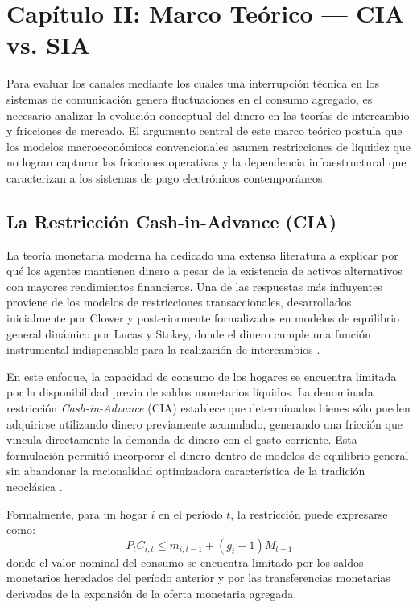 \newpage
\section{Cap\'itulo II: Marco Te\'orico --- CIA vs. SIA}\label{capitulo2}

Para evaluar los canales mediante los cuales una interrupci\'on t\'ecnica en los sistemas de comunicaci\'on genera fluctuaciones en el consumo agregado, es necesario analizar la evoluci\'on conceptual del dinero en las teor\'ias de intercambio y fricciones de mercado. El argumento central de este marco te\'orico postula que los modelos macroecon\'omicos convencionales asumen restricciones de liquidez que no logran capturar las fricciones operativas y la dependencia infraestructural que caracterizan a los sistemas de pago electr\'onicos contempor\'aneos.

\subsection{La Restricci\'on Cash-in-Advance (CIA)}
\label{sec:2_1}

La teor\'ia monetaria moderna ha dedicado una extensa literatura a explicar 
por qu\'e los agentes mantienen dinero a pesar de la existencia de activos 
alternativos con mayores rendimientos financieros. Una de las respuestas m\'as 
influyentes proviene de los modelos de restricciones transaccionales, desarrollados 
inicialmente por Clower y posteriormente formalizados en modelos de equilibrio 
general din\'amico por Lucas y Stokey, donde el dinero cumple una funci\'on 
instrumental indispensable para la realizaci\'on de intercambios \citep{lucas1987money, clower1967reconsideration}.

En este enfoque, la capacidad de consumo de los hogares se encuentra limitada por 
la disponibilidad previa de saldos monetarios l\'iquidos. La denominada restricci\'on 
\textit{Cash-in-Advance} (CIA) establece que determinados bienes s\'olo pueden 
adquirirse utilizando dinero previamente acumulado, generando una fricci\'on que 
vincula directamente la demanda de dinero con el gasto corriente. Esta formulaci\'on 
permiti\'o incorporar el dinero dentro de modelos de equilibrio general sin abandonar 
la racionalidad optimizadora caracter\'istica de la tradici\'on neocl\'asica 
\citep{woodford2003interest, lucas1987money}.

Formalmente, para un hogar $i$ en el per\'iodo $t$, la restricci\'on puede expresarse como:
\begin{equation}
P_t C_{i,t} \leq m_{i,t-1} + (g_t - 1)M_{t-1}
\end{equation}
donde el valor nominal del consumo se encuentra limitado por los saldos monetarios 
heredados del per\'iodo anterior y por las transferencias monetarias derivadas de 
la expansi\'on de la oferta monetaria agregada.

